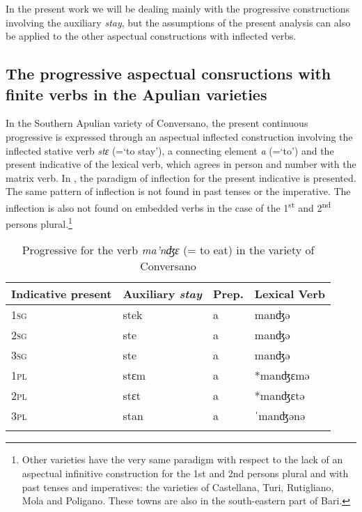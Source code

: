 \documentclass[output=paper]{langsci/langscibook}
\begin{document}
In the present work we will be dealing mainly with the progressive constructions involving the auxiliary \textit{stay}, but the assumptions of the present analysis can also be applied to the other aspectual constructions with inflected verbs.

\subsection{The progressive aspectual consructions with finite verbs in the Apulian varieties}%

In the Southern Apulian variety of Conversano, the present continuous progressive is expressed through an aspectual inflected construction involving the inflected stative verb \textit{stɛ} (=‘to stay’), a connecting element \textit{a} (=‘to’) and the present indicative of the lexical verb, which agrees in person and number with the matrix verb. In , the paradigm of inflection for the present indicative is presented. The same pattern of inflection is not found in past tenses or the imperative. The inflection is also not found on embedded verbs in the case of the 1\textsuperscript{st} and 2\textsuperscript{nd} persons plural.\footnote{Other varieties have the very same paradigm with respect to the lack of an aspectual infinitive construction for the 1st and 2nd persons plural and with past tenses and imperatives: the varieties of Castellana, Turi, Rutigliano, Mola and Poligano. These towns are also in the south-eastern part of Bari.} 

\begin{table}
\begin{tabular}{*{4}{l}}
\lsptoprule
Indicative present & Auxiliary \textit{stay} & Prep. & Lexical Verb\\\midrule
\scshape 1sg & stek & a & manʤə\\
\scshape 2sg & ste & a & manʤə\\
\scshape 3sg & ste & a & manʤə\\
\scshape 1pl & stɛm & a & *manʤɛmə\\
\scshape 2pl & stɛt & a & *manʤɛtə\\
\scshape 3pl & stan & a & ˈmanʤənə\\
\lspbottomrule
\end{tabular}
\caption{Progressive for the verb \textit{ma’nʤɛ} (= to eat) in the variety of Conversano\label{tab:lorusso:1}}
\end{table}
\end{document}
